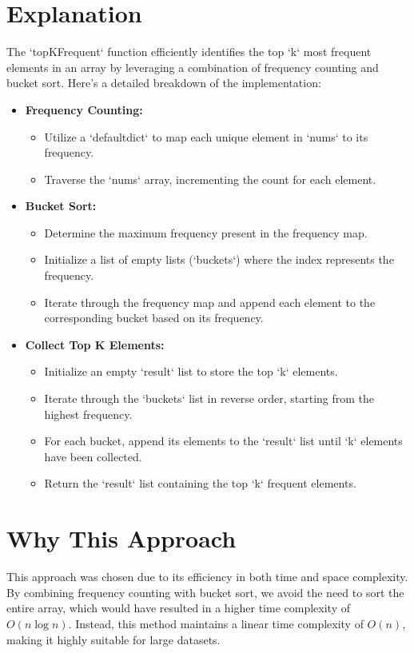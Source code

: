 \section*{Explanation}
The `topKFrequent` function efficiently identifies the top `k` most frequent elements in an array by leveraging a combination of frequency counting and bucket sort. Here's a detailed breakdown of the implementation:

\begin{itemize}
    \item \textbf{Frequency Counting:}
    \begin{itemize}
        \item Utilize a `defaultdict` to map each unique element in `nums` to its frequency.
        \item Traverse the `nums` array, incrementing the count for each element.
    \end{itemize}
    
    \item \textbf{Bucket Sort:}
    \begin{itemize}
        \item Determine the maximum frequency present in the frequency map.
        \item Initialize a list of empty lists (`buckets`) where the index represents the frequency.
        \item Iterate through the frequency map and append each element to the corresponding bucket based on its frequency.
    \end{itemize}
    
    \item \textbf{Collect Top K Elements:}
    \begin{itemize}
        \item Initialize an empty `result` list to store the top `k` elements.
        \item Iterate through the `buckets` list in reverse order, starting from the highest frequency.
        \item For each bucket, append its elements to the `result` list until `k` elements have been collected.
        \item Return the `result` list containing the top `k` frequent elements.
    \end{itemize}
\end{itemize}

\section*{Why This Approach}
This approach was chosen due to its efficiency in both time and space complexity. By combining frequency counting with bucket sort, we avoid the need to sort the entire array, which would have resulted in a higher time complexity of \(O(n \log n)\). Instead, this method maintains a linear time complexity of \(O(n)\), making it highly suitable for large datasets.

